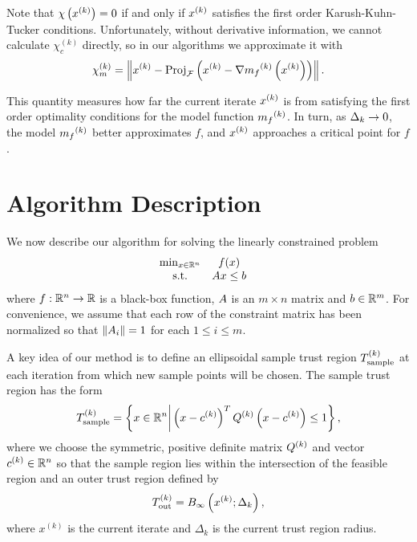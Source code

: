 \documentclass{article}
\begin{document}
Note that $\chi\left(x^{(k)}\right) = 0$ if and only if $x^{(k)}$ satisfies the first order Karush-Kuhn-Tucker conditions.
Unfortunately,  without derivative information, we cannot calculate $\chi_c^{(k)}$ directly,
so in our algorithms we approximate it with
\begin{align}
\label{define_criticality_measure}
{\chi_m^{(k)}} = \left\|x^{(k)} - {\textrm{Proj}}_{{\mathcal F}}\left(x^{(k)}- \nabla {{m}_f}^{(k)}\left(x^{(k)}\right)\right)\right\|.
\end{align}

This quantity measures how far the current iterate $x^{(k)}$ is from satisfying the first order optimality conditions for the model function ${{m}_f}^{(k)}$.
In turn, as $\Delta_k \to 0$, the model ${{m}_f}^{(k)}$ better approximates $f$,  and $x^{(k)}$ approaches a critical point for $f$.









\section{Algorithm Description}
\label{sec:linear}
We now describe our algorithm for solving the linearly constrained problem
\begin{align}
\label{eq:DFO-linear}
\begin{array}{ccl} \min_{x \in \mathbb R^n} & f(x) \\
\textrm{s.t.} & {A} x \le {b} & 
\end{array}
\end{align}
where $f:\mathbb R^n\rightarrow\mathbb R$ is a black-box function, 
${A}$ is an $m \times n$ matrix and ${b} \in \mathbb R^m$.
For convenience, we assume that each row of the constraint matrix has been normalized so that
$\left\|{A}_i\right\| = 1$ for each $1 \le i \le m$.


A key idea of our method is to define an ellipsoidal sample trust region ${T_{\text{sample}}^{(k)}}$ at each iteration from which new sample points will be chosen.   The sample trust region has the form
\begin{equation}
\label{define_the_sample_region}
{T_{\text{sample}}^{(k)}} = \left\{x \in \mathbb R^n \bigg | \left(x - c^{(k)}\right)^T {Q^{(k)}} \left(x - c^{(k)}\right) \le 1 \right\},
\end{equation}
where we choose the symmetric, positive definite matrix ${Q^{(k)}}$ and vector $c^{(k)} \in \mathbb R^n$ so that
the sample region lies within the intersection of the feasible region and an outer trust region defined by
\begin{equation}
\label{define_outer_trust_region}
{T_{\text{out}}^{(k)}} = B_{\infty}\left(x^{(k)};\Delta_k\right),
\end{equation}
where $x^{(k)}$ is the current iterate and $\Delta_k$ is the current trust region radius.
\end{document}
